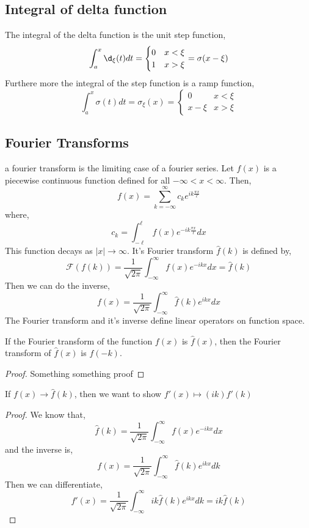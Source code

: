 \subsection{Integral of delta function}
The integral of the delta function is the unit step function,
$$ \int_a^x \d_\xi (t)dt = \begin{cases}
  0 & x < \xi \\
  1 & x > \xi
\end{cases} = \sigma (x - \xi)$$
Furthere more the integral of the step function is a ramp function,
$$ \int_a^x \sigma (t)dt = \sigma_\xi (x) = \begin{cases}
  0 & x < \xi \\
  x - \xi & x > \xi
\end{cases} $$

\subsection{Fourier Transforms}
a fourier transform is the limiting case of a fourier series. Let $f(x)$ is a piecewise continuous function defined for all $-\infty < x < \infty$. Then,
$$ f(x) = \sum_{k = -\infty}^\infty c_ke^{ik \frac{\pi x}{\ell}} $$
where,
$$ c_k = \int_{-\ell}^\ell f(x)e^{-ik \frac{\pi x}{\ell}}dx $$
This function decays as $|x|\to \infty$. It's Fourier transform $\hat f(k)$ is defined by,
$$ \mathcal{F} (f(k)) = \frac{1}{\sqrt{2\pi}}\int_{-\infty}^\infty f(x)e^{-ikx}dx = \hat f(k)   $$
Then we can do the inverse,
$$ f(x) = \frac{1}{\sqrt{2\pi}}\int_{-\infty}^\infty \hat f(k)e^{ikx}dx $$
The Fourier transform and it's inverse define linear operators on function space.

\begin{nthm}[]
  If the Fourier transform of the function $f(x)$ is $\hat f(x)$, then the Fourier transform of $\hat f(x)$ is $f(-k)$.
\end{nthm}
\begin{proof}
  Something something proof
\end{proof}

\begin{nthm}[]
  If $f(x) \to \hat f(k)$, then we want to show $f'(x) \mapsto (ik)f'(k)$
\end{nthm}
\begin{proof}
  We know that,
  $$ \hat f(k) = \frac{1}{\sqrt{2\pi}}\int_{-\infty}^\infty f(x)e^{-ikx}dx $$
  and the inverse is,
  $$ f(x) = \frac{1}{\sqrt{2\pi}}\int_{-\infty}^\infty \hat f(k)e^{ikx}dk $$
  Then we can differentiate,
  $$ f'(x) = \frac{1}{\sqrt{2\pi}}\int_{-\infty}^\infty  ik\hat f(k)e^{ikx}dk = ik\hat f(k)$$
\end{proof}

